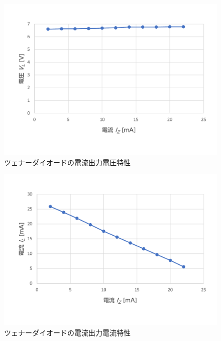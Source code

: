 	\begin{figure}[!h]
		\centering
		\includegraphics[width=13cm]{./figs/G-zener_IZ-VL.pdf}
		\caption{ツェナーダイオードの電流出力電圧特性}
		\label{fig:zener_IZ-VL}
	\end{figure}
	\begin{figure}[!h]
		\centering
		\includegraphics[width=13cm]{./figs/G-zener_IZ-IL.pdf}
		\caption{ツェナーダイオードの電流出力電流特性}
		\label{fig:zener_IZ-IL}
	\end{figure}

